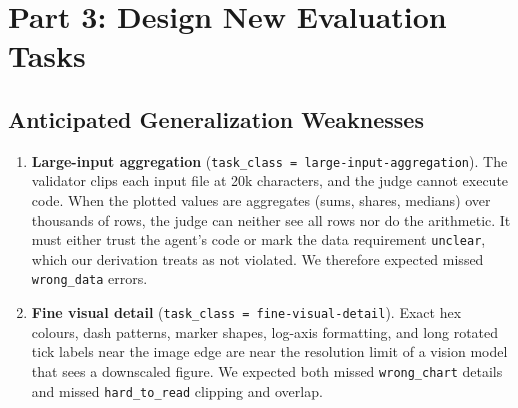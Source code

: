 \documentclass[11pt]{article}
\begin{document}
\section{Part 3: Design New Evaluation Tasks}

\subsection{Anticipated Generalization Weaknesses}
\begin{enumerate}
\item \textbf{Large-input aggregation} (\texttt{task\_class =
large-input-aggregation}). The validator clips each input file at 20k
characters, and the judge cannot execute code. When the plotted values are
aggregates (sums, shares, medians) over thousands of rows, the judge can
neither see all rows nor do the arithmetic. It must either trust the agent's
code or mark the data requirement \texttt{unclear}, which our derivation treats
as not violated. We therefore expected missed \texttt{wrong\_data} errors.
\item \textbf{Fine visual detail} (\texttt{task\_class = fine-visual-detail}).
Exact hex colours, dash patterns, marker shapes, log-axis formatting, and long
rotated tick labels near the image edge are near the resolution limit of a
vision model that sees a downscaled figure. We expected both missed
\texttt{wrong\_chart} details and missed \texttt{hard\_to\_read} clipping and
overlap.
\end{enumerate}
\end{document}
